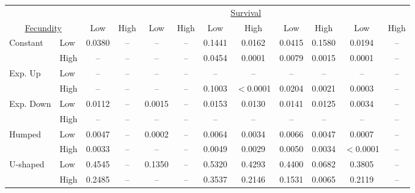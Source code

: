\documentclass[12pt,review,authoryear]{elsarticle}
\begin{document}
\begin{sidewaystable}
\begin{center}
\begin{tabular}{llcccccccccc}
\hline
& & \multicolumn{10}{c}{\underline{Survival}}
& & & \multicolumn{2}{c}{Constant} & \multicolumn{2}{c}{Exp. Up}  &  \multicolumn{2}{c}{Exp. Down} &  \multicolumn{2}{c}{Humped}  & \multicolumn{2}{c}{U-shaped} \\
\multicolumn{2}{c}{\underline{Fecundity}}& Low & High &  Low & High & Low & High & Low & High & Low & High \\
\hline
\multirow{ 2}{*}{Constant}   & Low   & 0.0380 & -- & -- & -- & 0.1441 & 0.0162 & 0.0415 & 0.1580 & 0.0194 & -- \\
                             & High  & -- & -- &  -- & -- & 0.0454 & 0.0001 & 0.0079 & 0.0015 & 0.0001 & -- \\
\multirow{ 2}{*}{Exp. Up}    & Low   & -- & -- & -- & -- & -- & -- & -- & -- & -- & -- \\
                             & High  & -- & -- & -- & -- & 0.1003 & $<$0.0001 & 0.0204 & 0.0021 & 0.0003 & -- \\
\multirow{ 2}{*}{Exp. Down}  & Low   & 0.0112 & -- & 0.0015 & -- & 0.0153 & 0.0130 & 0.0141 & 0.0125 & 0.0034 & -- \\
                             & High  & -- & -- & -- & -- & -- & -- & -- & -- & -- & -- \\
\multirow{ 2}{*}{Humped}     & Low   & 0.0047 & -- & 0.0002 & -- & 0.0064 & 0.0034 & 0.0066 & 0.0047 & 0.0007 & -- \\
                             & High  & 0.0033 & -- &  -- & -- & 0.0049 & 0.0029 & 0.0050 & 0.0034 & $<$0.0001 & -- \\
\multirow{ 2}{*}{U-shaped}   & Low   & 0.4545 & -- &  0.1350 & -- & 0.5320 & 0.4293 & 0.4400 & 0.0682 & 0.3805 & -- \\
                             & High  & 0.2485 & -- & -- & -- & 0.3537 & 0.2146 & 0.1531 & 0.0065 & 0.2119 & -- \\
\hline
\end{tabular}
\end{center}
\end{sidewaystable}
\end{document}
